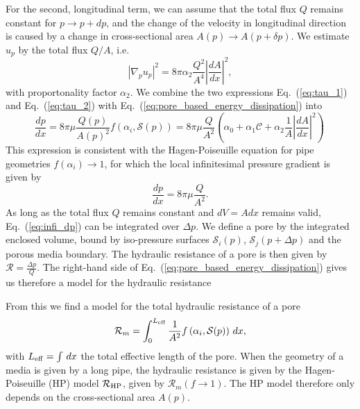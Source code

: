 \documentclass[draft]{agujournal2019}
\begin{document}
For the second, longitudinal term, we can assume that the total flux $Q$ remains constant for $p\rightarrow p+dp$, and the change of the velocity in longitudinal direction is caused by a change in cross-sectional area $A(p)\rightarrow A(p+\delta p)$. We estimate $u_p$ by the total flux $Q/A$, i.e. 
\begin{equation}
	\left|\nabla_p u_p\right|^2 =  8\pi  \alpha_2\frac{Q^2}{A^4}\left|\frac{dA}{dx }\right|^2,\label{eq:tau_2}
\end{equation}
with proportonality factor $\alpha_2$. We combine the two expressions Eq.~(\ref{eq:tau_1}) and Eq.~(\ref{eq:tau_2}) with Eq.~(\ref{eq:pore_based_energy_dissipation}) into
\begin{equation}
	\frac{dp}{dx} = 8\pi \mu \frac{Q(p)}{A(p)^2} f\left(\alpha_i,\mathcal{S}(p) \right) = 8 \pi \mu\frac{Q}{A^2}\left(\alpha_0+\alpha_1\mathcal{C} + \alpha_2 \frac{1}{A}\left|\frac{d A}{d x}\right|^2\right)\,\label{eq:infi_dp}
\end{equation}
This expression is consistent with the Hagen-Poiseuille equation for pipe geometries $f(\alpha_i)\rightarrow 1$, for which the local infinitesimal pressure gradient is given by 
\begin{equation}
	\frac{d p}{d x} = 8 \pi \mu\frac{Q}{A^2}\label{eq:HP}.
\end{equation} 
As long as the total flux $Q$ remains constant and $dV = Adx$ remains valid, Eq.~(\ref{eq:infi_dp}) can be integrated over $\Delta p$. We define a pore by the integrated enclosed volume, bound by iso-pressure surfaces $\mathcal{S}_i(p)$, $\mathcal{S}_j(p+\Delta p)$ and the porous media boundary. The hydraulic resistance of a pore is then given by $\mathcal{R}= \frac{\Delta p}{Q}$. The right-hand side of Eq.~(\ref{eq:pore_based_energy_dissipation}) gives us therefore a model for the hydraulic resistance 

 From this we find a model for the total hydraulic resistance of a pore
\begin{equation}
	\mathcal{R}_m = \int^{L_{\rm{eff}}}_{0}\frac{1}{A^2}f\left(\alpha_i,\mathcal{S}(p)\right)\,dx\label{eq:R_model},
\end{equation}
with $L_{\rm{eff}}= \int\,dx $ the total effective length of the pore. When the geometry of a media is given by a long pipe, the hydraulic resistance is given by the Hagen-Poiseuille (HP) model $\mathcal{R}_{\rm{HP}}$, given by $\mathcal{R}_m(f\rightarrow 1)$. The HP model therefore only depends on the cross-sectional area $A(p)$.
\end{document}
